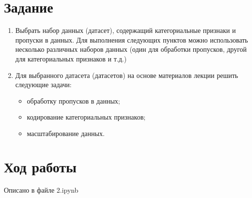 \documentclass[a4paper]{article}
\begin{document}
  \section*{Задание}
  \begin{enumerate}
    \item
      Выбрать набор данных (датасет), содержащий категориальные признаки и пропуски в данных.
      Для выполнения следующих пунктов можно использовать несколько различных наборов данных
      (один для обработки пропусков, другой для категориальных признаков и т.д.)
    \item
      Для выбранного датасета (датасетов) на основе материалов лекции решить следующие задачи:

      \begin{itemize}
        \item обработку пропусков в данных;
        \item кодирование категориальных признаков;
        \item масштабирование данных.
      \end{itemize}
  \end{enumerate}

  \section*{Ход работы}
  Описано в файле 2.ipynb
\end{document}
